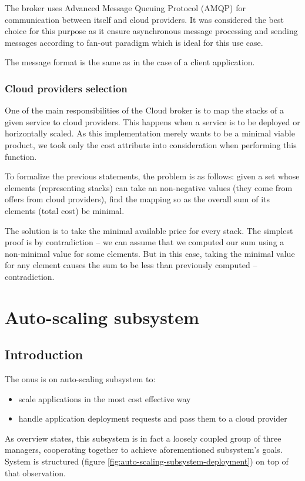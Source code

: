 The broker uses Advanced Message Queuing Protocol (AMQP) for communication between itself and cloud providers. It was considered the best choice for this purpose as it ensure asynchronous message processing and sending messages according to fan-out paradigm which is ideal for this use case.

The message format is the same as in the case of a client application.

\subsubsection{Cloud providers selection}
One of the main responsibilities of the Cloud broker is to map the stacks of a given service to cloud providers. This happens when a service is to be deployed or horizontally scaled. As this implementation merely wants to be a minimal viable product, we took only the cost attribute into consideration when performing this function.

To formalize the previous statements, the problem is as follows: given a set whose elements (representing stacks) can take an non-negative values (they come from offers from cloud providers), find the mapping so as the overall sum of its elements (total cost) be minimal.

The solution is to take the minimal available price for every stack. The simplest proof is by contradiction -- we can assume that we computed our sum using a non-minimal value for some elements. But in this case, taking the minimal value for any element causes the sum to be less than previously computed -- contradiction.

\section{Auto-scaling subsystem}

\subsection{Introduction}
The onus is on auto-scaling subsystem to:
\begin{itemize}
 \item scale applications in the most cost effective way
 \item handle application deployment requests and pass them to a cloud provider 
\end{itemize}

As overview states, this subsystem is in fact a loosely coupled group of three managers, cooperating together to achieve aforementioned subsystem's goals. System is structured (figure \ref{fig:auto-scaling-subsystem-deployment}) on top of that observation.

